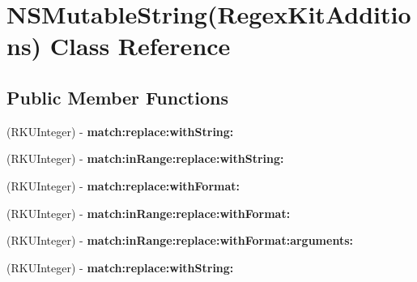 \hypertarget{interface_n_s_mutable_string_07_regex_kit_additions_08}{\section{N\-S\-Mutable\-String(Regex\-Kit\-Additions) Class Reference}
\label{interface_n_s_mutable_string_07_regex_kit_additions_08}
}
\subsection*{Public Member Functions}
\begin{DoxyCompactItemize}
\item 
\hypertarget{interface_n_s_mutable_string_07_regex_kit_additions_08_afc9445a9458cb90420edea4e44c32669}{(R\-K\-U\-Integer) -\/ {\bfseries match\-:replace\-:with\-String\-:}}\label{interface_n_s_mutable_string_07_regex_kit_additions_08_afc9445a9458cb90420edea4e44c32669}

\item 
\hypertarget{interface_n_s_mutable_string_07_regex_kit_additions_08_a8efcb6d01932a250278cad5af37e76a6}{(R\-K\-U\-Integer) -\/ {\bfseries match\-:in\-Range\-:replace\-:with\-String\-:}}\label{interface_n_s_mutable_string_07_regex_kit_additions_08_a8efcb6d01932a250278cad5af37e76a6}

\item 
\hypertarget{interface_n_s_mutable_string_07_regex_kit_additions_08_aab5f247bd3a01bbc663625df0752c3fb}{(R\-K\-U\-Integer) -\/ {\bfseries match\-:replace\-:with\-Format\-:}}\label{interface_n_s_mutable_string_07_regex_kit_additions_08_aab5f247bd3a01bbc663625df0752c3fb}

\item 
\hypertarget{interface_n_s_mutable_string_07_regex_kit_additions_08_a5d069dd4e5caa58cd6f2e31b7821e8bf}{(R\-K\-U\-Integer) -\/ {\bfseries match\-:in\-Range\-:replace\-:with\-Format\-:}}\label{interface_n_s_mutable_string_07_regex_kit_additions_08_a5d069dd4e5caa58cd6f2e31b7821e8bf}

\item 
\hypertarget{interface_n_s_mutable_string_07_regex_kit_additions_08_a9eee815b73d0cd248a0c8a0dee9a3a75}{(R\-K\-U\-Integer) -\/ {\bfseries match\-:in\-Range\-:replace\-:with\-Format\-:arguments\-:}}\label{interface_n_s_mutable_string_07_regex_kit_additions_08_a9eee815b73d0cd248a0c8a0dee9a3a75}

\item 
\hypertarget{interface_n_s_mutable_string_07_regex_kit_additions_08_afc9445a9458cb90420edea4e44c32669}{(R\-K\-U\-Integer) -\/ {\bfseries match\-:replace\-:with\-String\-:}}\label{interface_n_s_mutable_string_07_regex_kit_additions_08_afc9445a9458cb90420edea4e44c32669}


\end{DoxyCompactItemize}
